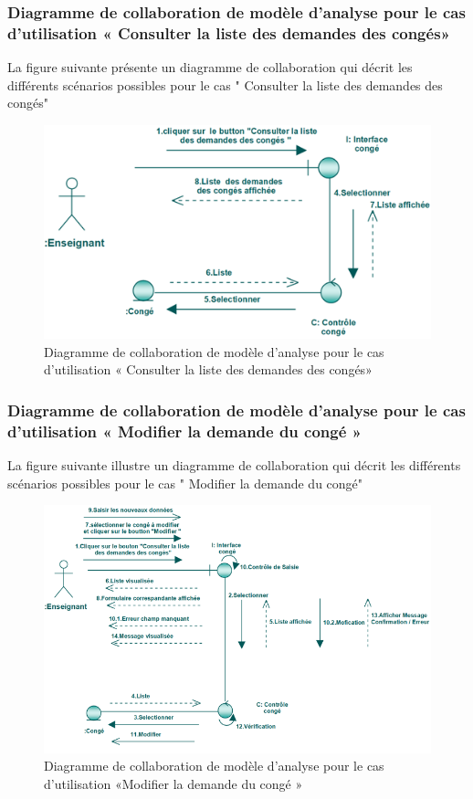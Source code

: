\documentclass[12 pt ]{report}
\begin{document}
\subsubsection{Diagramme  de  collaboration  de  modèle  d'analyse  pour  le  cas  d'utilisation « Consulter la liste des demandes des congés»  }
La figure suivante présente un diagramme de collaboration qui décrit les différents
scénarios possibles pour le cas " Consulter la liste des demandes des congés"
\begin{figure}[h]
\begin{center}
\includegraphics[width= 12 cm , height =3.5 cm]{collaconscontrai.PNG}
 \caption{Diagramme  de  collaboration  de  modèle  d'analyse  pour  le  cas  d'utilisation « Consulter la liste des demandes des congés»}
\end{center}
\end{figure}
\subsubsection{Diagramme  de  collaboration  de  modèle  d'analyse  pour  le  cas  d'utilisation « Modifier la demande du  congé »  }
La figure suivante illustre un diagramme de collaboration qui décrit les différents
scénarios possibles pour le cas " Modifier la   demande du  congé"
\begin{figure}[h]
\begin{center}
\includegraphics[width= 14cm , height =5.4 cm]{colla_ens_modifierconge.PNG}
 \caption{Diagramme  de  collaboration  de  modèle  d'analyse  pour  le  cas  d'utilisation «Modifier la demande du  congé »}
\end{center}
\end{figure}
\end{document}
